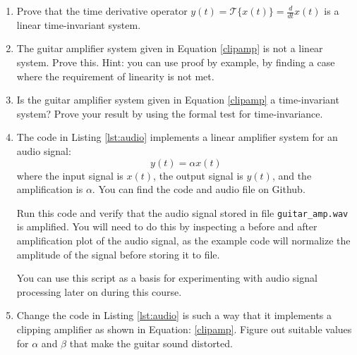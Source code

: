 \begin{enumerate}
\item Prove that the time derivative operator $y(t) = \mathcal{T}\{x(t)\} = \frac{d}{dt} x(t)$
is a linear time-invariant system.

\item The guitar amplifier system given in Equation \ref{clipamp} is not a linear system. Prove this. Hint: you can use proof by example, by finding a case where the requirement of linearity is not met. 

\item Is the guitar amplifier system given in Equation \ref{clipamp} a time-invariant system? Prove your result by using the formal test for time-invariance.

\item The code in Listing \ref{lst:audio} implements a linear amplifier system for an audio signal:
\begin{equation}
y(t) = \alpha x(t)
\end{equation}
where the input signal is $x(t)$, the output signal is $y(t)$, and the amplification is $\alpha$. You can find the code and audio file on Github.

Run this code and verify that the audio signal stored in
file \verb|guitar_amp.wav| is amplified. You will need to do this by inspecting a before and after amplification plot of the audio signal, as the example code will normalize the amplitude of the signal before storing it to file.

You can use this script as a basis for experimenting with audio signal processing later on during this course.

\item Change the code in Listing \ref{lst:audio} is such a way that it implements a clipping amplifier as shown in Equation: \ref{clipamp}. Figure out suitable values for $\alpha$ and $\beta$ that make the guitar sound distorted.

\end{enumerate}
